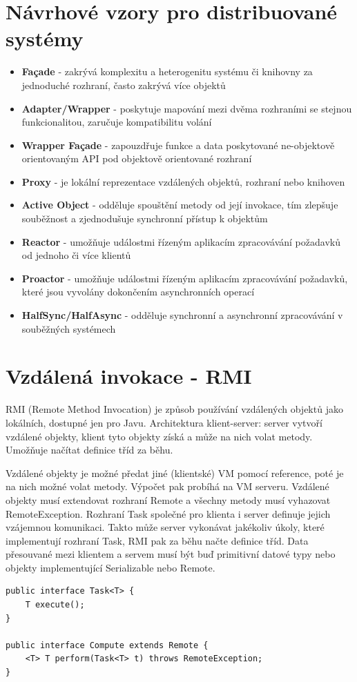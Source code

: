 \documentclass{scrreprt}
\begin{document}
\section{Návrhové vzory pro distribuované systémy}
\begin{itemize}
\item \textbf{Façade} - zakrývá komplexitu a heterogenitu systému či knihovny za jednoduché rozhraní, často zakrývá více objektů
\item \textbf{Adapter/Wrapper} - poskytuje mapování mezi dvěma rozhraními se stejnou funkcionalitou, zaručuje kompatibilitu volání
\item \textbf{Wrapper Façade} - zapouzdřuje funkce a data poskytované ne-objektově orientovaným API pod objektově orientované rozhraní
\item \textbf{Proxy} - je lokální reprezentace vzdálených objektů, rozhraní nebo knihoven
\item \textbf{Active Object} - odděluje spouštění metody od její invokace, tím zlepšuje souběžnost a zjednodušuje synchronní přístup k objektům
\item \textbf{Reactor} - umožňuje událostmi řízeným aplikacím zpracovávání požadavků od jednoho či více klientů
\item \textbf{Proactor} - umožňuje událostmi řízeným aplikacím zpracovávání požadavků, které jsou vyvolány dokončením asynchronních operací
\item \textbf{HalfSync/HalfAsync} - odděluje synchronní a asynchronní zpracovávání v souběžných systémech
\end{itemize}

\section{Vzdálená invokace - RMI}
RMI (Remote Method Invocation) je způsob používání vzdálených objektů jako lokálních, dostupné jen pro Javu. Architektura klient-server: server vytvoří vzdálené objekty, klient tyto objekty získá a může na nich volat metody. Umožňuje načítat definice tříd za běhu.

Vzdálené objekty je možné předat jiné (klientské) VM pomocí reference, poté je na nich možné volat metody. Výpočet pak probíhá na VM serveru. Vzdálené objekty musí extendovat rozhraní \textsf{Remote} a všechny metody musí vyhazovat \textsf{RemoteException}. Rozhraní \textsf{Task} společné pro klienta i server definuje jejich vzájemnou komunikaci. Takto může server vykonávat jakékoliv úkoly, které implementují rozhraní \textsf{Task}, RMI pak za běhu načte definice tříd. Data přesouvané mezi klientem a servem musí být buď primitivní datové typy nebo objekty implementující \textsf{Serializable} nebo \textsf{Remote}.
\begin{verbatim}
public interface Task<T> {
    T execute();
}

public interface Compute extends Remote {
    <T> T perform(Task<T> t) throws RemoteException;
}
\end{verbatim}
\end{document}
